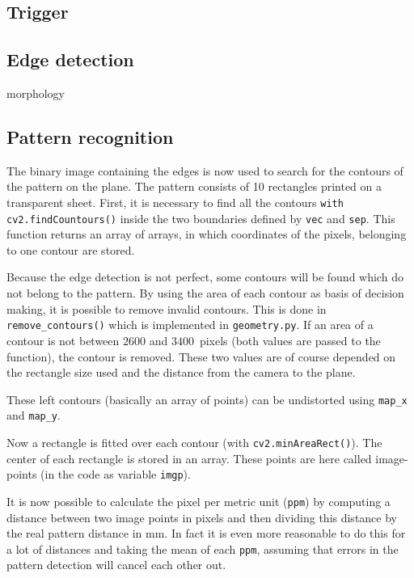 \subsection{Trigger}

\subsection{Edge detection}
morphology

\subsection{Pattern recognition}
The binary image containing the edges is now used to search for the contours of the pattern on the plane.
The pattern consists of 10 rectangles printed on a transparent sheet.
First, it is necessary to find all the contours \texttt{with cv2.findCountours()} inside the two boundaries defined by \texttt{vec} and \texttt{sep}.
This function returns an array of arrays, in which coordinates of the pixels, belonging to one contour are stored.

Because the edge detection is not perfect, some contours will be found which do not belong to the pattern.
By using the area of each contour as basis of decision making, it is possible to remove invalid contours.
This is done in \texttt{remove\_contours()} which is implemented in \texttt{geometry.py}.
If an area of a contour is not between $2600$ and $3400\,$ pixels (both values are passed to the function), the contour is removed.
These two values are of course depended on the rectangle size used and the distance from the camera to the plane.

These left contours (basically an array of points) can be undistorted using \texttt{map\_x} and \texttt{map\_y}.

Now a rectangle is fitted over each contour (with \texttt{cv2.minAreaRect()}).
The center of each rectangle is stored in an array.
These points are here called image-points (in the code as variable \texttt{imgp}).

It is now possible to calculate the pixel per metric unit (\texttt{ppm}) by computing a distance between two image points in pixels and then dividing this distance by the real pattern distance in mm.
In fact it is even more reasonable to do this for a lot of distances and taking the mean of each \texttt{ppm}, assuming that errors in the pattern detection will cancel each other out.

